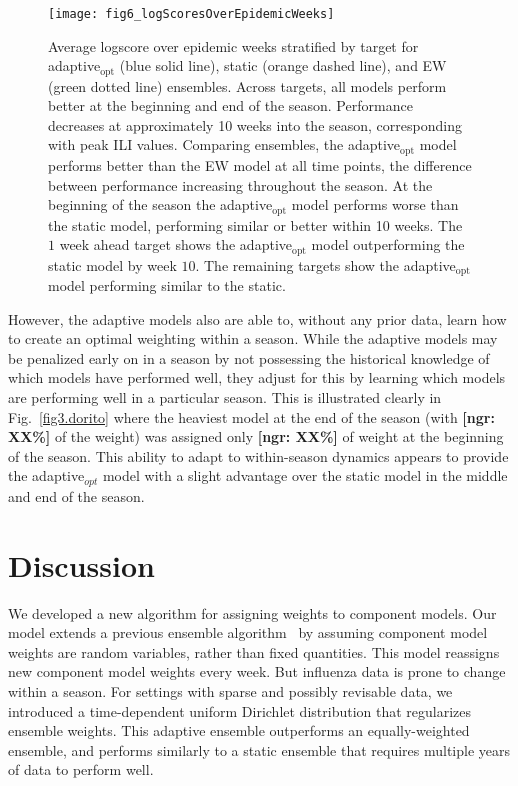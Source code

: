 \documentclass[12pt]{article}
\def\ngr#1{{\small\color{Red}\textbf{[ngr: #1]}}}
\begin{document}
\graphicspath{{../_6_TLGs/_G/fig6_logScoresByEpidemicWeek/}}
\begin{figure}[ht!]
    \centering
    \texttt{[image: fig6\_logScoresOverEpidemicWeeks]}
    \caption{
    Average logscore over epidemic weeks stratified by target for adaptive$_{\mathrm{opt}}$ (blue solid line), static (orange dashed line), and EW (green dotted line) ensembles.
    Across targets, all models perform better at the beginning and end of the season.
    Performance decreases at approximately 10 weeks into the season, corresponding with peak ILI values.
    Comparing ensembles, the adaptive$_{\mathrm{opt}}$ model performs better than the EW model at all time points, the difference between performance increasing throughout the season.
    At the beginning of the season the adaptive$_{\mathrm{opt}}$ model performs worse than the static model, performing similar or better within 10 weeks. 
    The $1$ week ahead target shows the adaptive$_{\mathrm{opt}}$ model outperforming the static model by week $10$.
    The remaining targets show the adaptive$_{\mathrm{opt}}$ model performing similar to the static.
    \label{fig6.logScoresOverEpidemicWeeks}}
\end{figure}

However, the adaptive models also are able to, without any prior data, learn how to create an optimal weighting within a season. 
While the adaptive models may be penalized early on in a season by not possessing the historical knowledge of which models have performed well, they adjust for this by learning which models are performing well in a particular season. 
This is illustrated clearly in Fig.~\ref{fig3.dorito} where the heaviest model at the end of the season (with \ngr{XX\%} of the weight) was assigned only \ngr{XX\%} of weight at the beginning of the season. 
This ability to adapt to within-season dynamics appears to provide the adaptive$_{opt}$ model with a slight advantage over the static model in the middle and end of the season.

\section{Discussion}

We developed a new algorithm for assigning weights to component models.
Our model extends a previous ensemble algorithm~\cite{reich2019collaborative} by assuming component model weights are random variables, rather than fixed quantities.
This model reassigns new component model weights every week.
But influenza data is prone to change within a season.
For settings with sparse and possibly revisable data, we introduced a time-dependent uniform Dirichlet distribution that regularizes ensemble weights. 
This adaptive ensemble outperforms an equally-weighted ensemble, and performs similarly to a static ensemble that requires multiple years of data to perform well.
\end{document}
